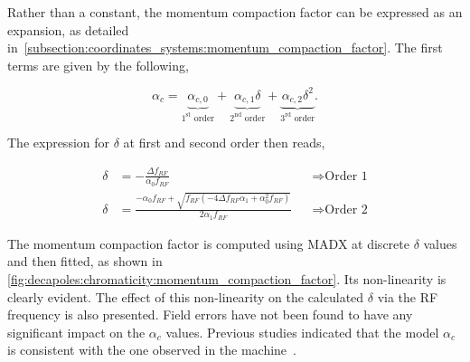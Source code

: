 \FloatBarrier
\subsubsection{}
\label{subsubsection:momentum_compaction_factor_studies}

Rather than a constant, the momentum compaction factor can be expressed as an
expansion, as detailed in~\cref{subsection:coordinates_systems:momentum_compaction_factor}.
The first terms are given by the following,

\begin{equation}
    \alpha_c = 
    \underbrace{\alpha_{c,0}}_{1^\text{st} \text{ order}}
    + \underbrace{\alpha_{c,1} \delta}_{2^\text{nd} \text{ order}}
    + \underbrace{\alpha_{c,2} \delta^2}_{3^\text{rd} \text{ order}}.
\end{equation}

The expression for $\delta$ at first and second order then reads,

\begin{equation}
    \begin{aligned}
        \delta &= -\frac{\Delta f_{RF}}{\alpha_{0} f_{RF}} && \Rightarrow \text{Order 1} \\
        \delta &= \frac{- \alpha_{0} f_{RF} + \sqrt{f_{RF} 
            \left(- 4 \Delta f_{RF} \alpha_{1} + \alpha_{0}^{2} f_{RF}\right)}}{2 \alpha_{1} f_{RF}}
            && \Rightarrow \text{Order 2} 
    \end{aligned}
\end{equation}

The momentum compaction factor is computed using MADX at discrete $\delta$ values and then fitted,
as shown in \cref{fig:decapoles:chromaticity:momentum_compaction_factor}. Its non-linearity is
clearly evident. The effect of this non-linearity on the calculated $\delta$ via the RF frequency is
also presented. Field errors have not been found to have any significant impact on the $\alpha_c$
values. Previous studies indicated that the model $\alpha_c$ is consistent with the one observed in
the machine~\cite{keintzel_momentum_2021}.

